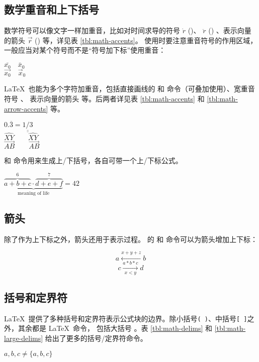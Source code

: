\subsection{数学重音和上下括号}

数学符号可以像文字一样加重音，比如对时间求导的符号 $\dot{r}$ ()、 $\ddot{r}$ ()
、表示向量的箭头 $\vec{r}$ () 等，详见表 \ref{tbl:math-accents}。
使用时要注意重音符号的作用区域，一般应当对某个符号而不是“符号加下标”使用重音：
\begin{example}
$\bar{x_0} \quad \bar{x}_0$\\[5pt]
$\vec{x_0} \quad \vec{x}_0$
\end{example}

\LaTeX\ 也能为多个字符加重音，包括直接画线的  和  命令（可叠加使用）、宽重音符号 、
表示向量的箭头  等。后两者详见表 \ref{tbl:math-accents} 和 \ref{tbl:math-arrow-accents} 等。
\begin{example}
$0.\overline{3} =
\underline{\underline{1/3}}$ \\[5pt]
$\hat{XY} \qquad \widehat{XY}$\\[5pt]
$\vec{AB} \qquad
\overrightarrow{AB}$
\end{example}

 和  命令用来生成上/下括号，各自可带一个上/下标公式。
\begin{example}
$\underbrace{\overbrace{a+b+c}^6
\cdot \overbrace{d+e+f}^7}
_\text{meaning of life} = 42$
\end{example}

\subsection{箭头}

除了作为上下标之外，箭头还用于表示过程。 的  和  命令可以为箭头增加上下标：
\begin{example}
\[ a\xleftarrow{x+y+z} b \]
\[ c\xrightarrow[x<y]{a*b*c}d \]
\end{example}

\subsection{括号和定界符}

\LaTeX\ 提供了多种括号和定界符表示公式块的边界。除小括号\texttt{( )}、中括号\texttt{[ ]}之外，其余都是 \LaTeX\ 命令，
包括大括号 \cmd{\{} \cmd{\}}。表 \ref{tbl:math-delims} 和 \ref{tbl:math-large-delims} 给出了更多的括号/定界符命令。
\begin{example}
${a,b,c} \neq \{a,b,c\}$
\end{example}

